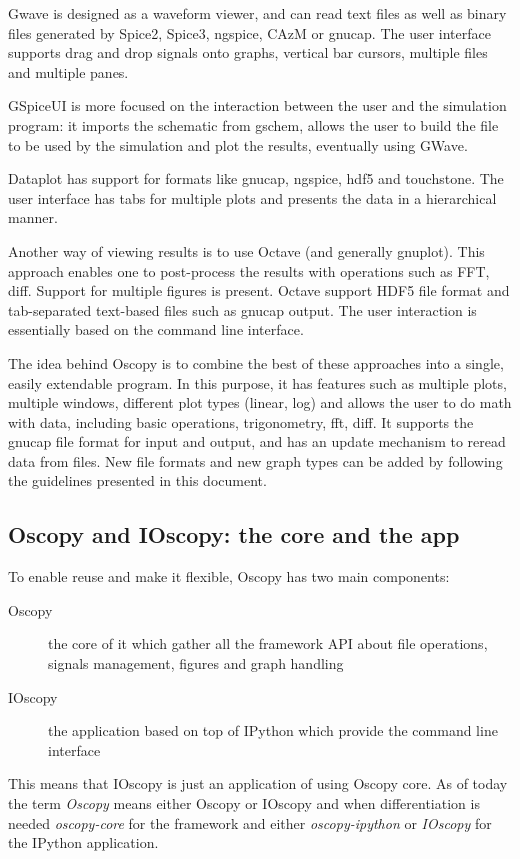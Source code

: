 \documentclass[a4paper,11pt]{article}
\begin{document}
Gwave is designed as a waveform viewer, and can read text files as well as binary files generated by Spice2, Spice3, ngspice, CAzM or gnucap.
The user interface supports drag and drop signals onto graphs, vertical bar cursors, multiple files and multiple panes.

GSpiceUI is more focused on the interaction between the user and the simulation program: it imports the schematic from gschem, allows the user to build the file to be used by the simulation and plot the results, eventually using GWave.

Dataplot has support for formats like gnucap, ngspice, hdf5 and touchstone.
The user interface has tabs for multiple plots and presents the data in a hierarchical manner.

Another way of viewing results is to use Octave (and generally gnuplot).
This approach enables one to post-process the results with operations such as FFT, diff.
Support for multiple figures is present.
Octave support HDF5 file format and tab-separated text-based files such as gnucap output.
The user interaction is essentially based on the command line interface.

The idea behind Oscopy is to combine the best of these approaches into a single, easily extendable program.
In this purpose, it has features such as multiple plots, multiple windows, different plot types (linear, log) and allows the user to do math with data, including basic operations, trigonometry, fft, diff.
It supports the gnucap file format for input and output, and has an update mechanism to reread data from files.
New file formats and new graph types can be added by following the guidelines presented in this document.

\subsection{Oscopy and IOscopy: the core and the app}
To enable reuse and make it flexible, Oscopy has two main components:
\begin{description}
\item[Oscopy] the core of it which gather all the framework API about file operations, signals management, figures and graph handling
\item[IOscopy] the application based on top of IPython which provide the command line interface
\end{description}
This means that IOscopy is just an application of using Oscopy core.
As of today the term \textsl{Oscopy} means either Oscopy or IOscopy and when differentiation is needed \textsl{oscopy-core} for the framework and either \textsl{oscopy-ipython} or \textsl{IOscopy} for the IPython application.
\end{document}
